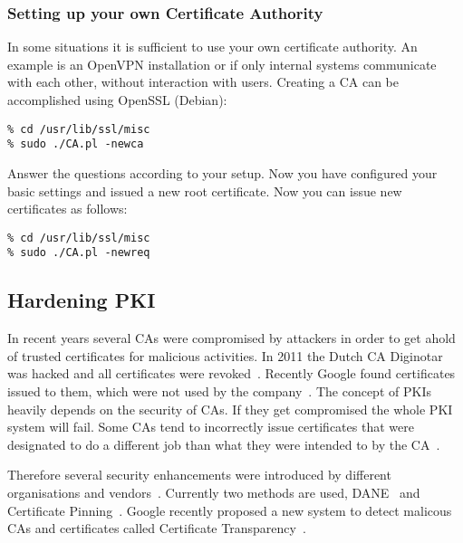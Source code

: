 \subsubsection{Setting up your own Certificate Authority}
\label{sec:setupownca}
In some situations it is sufficient to use your own certificate authority. An example is an OpenVPN
installation or if only internal systems communicate with each other, without interaction with users. 
Creating a CA can be accomplished using OpenSSL (Debian):

\begin{lstlisting}
% cd /usr/lib/ssl/misc
% sudo ./CA.pl -newca
\end{lstlisting}

Answer the questions according to your setup. Now you have configured your basic settings and 
issued a new root certificate. Now you can issue new certificates as follows:

\begin{lstlisting}
% cd /usr/lib/ssl/misc
% sudo ./CA.pl -newreq
\end{lstlisting}

\subsection{Hardening PKI}
\label{sec:hardeningpki}
In recent years several CAs were compromised by attackers in order to
get ahold of trusted certificates for malicious activities. In 2011 
the Dutch CA Diginotar was hacked and all certificates were
revoked~\cite{diginotar-hack}. Recently Google found certificates
issued to them, which were not used by the
company~\cite{googlecahack}. The concept of PKIs heavily depends on the
security of CAs.  If they get compromised the whole PKI system will
fail. Some CAs tend to incorrectly issue certificates that were designated
to do a different job than what they were intended to by the CA~\cite{gocode}.

Therefore several security enhancements were introduced by different
organisations and vendors~\cite{tschofenig-webpki}. Currently two
methods are used, DANE~\cite{rfc6698} and Certificate
Pinning~\cite{draft-ietf-websec-key-pinning}. Google recently proposed
a new system to detect malicous CAs and certificates  called Certificate 
Transparency~\cite{certtransparency}.


